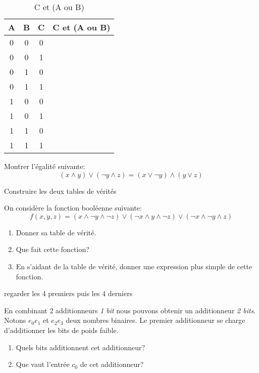 \documentclass[a4paper,11pt]{article}
\begin{document}
\begin{Form}
\begin{exo}
\begin{table}[!h]
\begin{center}
\begin{tabular}{|*4{c|}}
\hline 
A & B & C & C et (A ou B) \\ 
\hline 
0 & 0 & 0 &  \\ 
\hline 
0 & 0 & 1 & \\ 
\hline 
0 & 1 & 0 & \\
\hline 
0 & 1 & 1 & \\
\hline 
1 & 0 & 0 &  \\ 
\hline 
1 & 0 & 1 & \\ 
\hline 
1 & 1 & 0 & \\
\hline 
1 & 1 & 1 & \\
\hline 
\end{tabular}
\caption{\label{ex3}C et (A ou B)}
\end{center}
\end{table} 
\end{exo}
\begin{exo}
Montrer l'égalité suivante:
$$(x\land y)\lor (\lnot y \land z)=(x \lor \lnot y)\land (y \lor z)$$
\begin{commentprof}
Construire les deux tables de vérités
\end{commentprof}
\end{exo}
\begin{exo}
On considère la fonction booléenne suivante:
$$f(x,y,z)=(x\land \lnot y \land \lnot z)\lor (\lnot x \land y \land \lnot z) \lor (\lnot x \land \lnot y \land z)$$
\begin{enumerate}
\item Donner sa table de vérité.
\item Que fait cette fonction?
\item En s'aidant de la table de vérité, donner une expression plus simple de cette fonction.
\end{enumerate}
\begin{commentprof}
regarder les 4 premiers puis les 4 derniers
\end{commentprof}
\end{exo}
\begin{exo}
En combinant 2 additionneurs \emph{1 bit} nous pouvons obtenir un additionneur \emph{2 bits}. Notons $e_0e_1$ et $e_2e_3$ deux nombres binaires. Le premier additionneur se charge d'additionner les bits de poids faible.
\begin{enumerate}
\item Quels bits additionnent cet additionneur?
\item Que vaut l'entrée $c_0$ de cet additionneur?

\end{enumerate}
\end{exo}
\end{Form}
\end{document}
